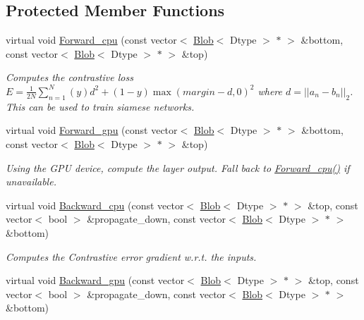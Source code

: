 \subsection*{Protected Member Functions}
\begin{DoxyCompactItemize}
\item 
virtual void \hyperlink{classcaffe_1_1ContrastiveLossLayer_a0719301088807da84f30ef2f028d0fde}{Forward\+\_\+cpu} (const vector$<$ \hyperlink{classcaffe_1_1Blob}{Blob}$<$ Dtype $>$ $\ast$ $>$ \&bottom, const vector$<$ \hyperlink{classcaffe_1_1Blob}{Blob}$<$ Dtype $>$ $\ast$ $>$ \&top)
\begin{DoxyCompactList}\small\item\em Computes the contrastive loss $ E = \frac{1}{2N} \sum\limits_{n=1}^N \left(y\right) d^2 + \left(1-y\right) \max \left(margin-d, 0\right)^2 $ where $ d = \left| \left| a_n - b_n \right| \right|_2 $. This can be used to train siamese networks. \end{DoxyCompactList}\item 
virtual void \hyperlink{classcaffe_1_1ContrastiveLossLayer_acc9c79ec2883380d41308c8212d0f845}{Forward\+\_\+gpu} (const vector$<$ \hyperlink{classcaffe_1_1Blob}{Blob}$<$ Dtype $>$ $\ast$ $>$ \&bottom, const vector$<$ \hyperlink{classcaffe_1_1Blob}{Blob}$<$ Dtype $>$ $\ast$ $>$ \&top)\hypertarget{classcaffe_1_1ContrastiveLossLayer_acc9c79ec2883380d41308c8212d0f845}{}\label{classcaffe_1_1ContrastiveLossLayer_acc9c79ec2883380d41308c8212d0f845}

\begin{DoxyCompactList}\small\item\em Using the G\+PU device, compute the layer output. Fall back to \hyperlink{classcaffe_1_1ContrastiveLossLayer_a0719301088807da84f30ef2f028d0fde}{Forward\+\_\+cpu()} if unavailable. \end{DoxyCompactList}\item 
virtual void \hyperlink{classcaffe_1_1ContrastiveLossLayer_ac29d021f30dbab75ca14cb79446926e5}{Backward\+\_\+cpu} (const vector$<$ \hyperlink{classcaffe_1_1Blob}{Blob}$<$ Dtype $>$ $\ast$ $>$ \&top, const vector$<$ bool $>$ \&propagate\+\_\+down, const vector$<$ \hyperlink{classcaffe_1_1Blob}{Blob}$<$ Dtype $>$ $\ast$ $>$ \&bottom)
\begin{DoxyCompactList}\small\item\em Computes the Contrastive error gradient w.\+r.\+t. the inputs. \end{DoxyCompactList}\item 
virtual void \hyperlink{classcaffe_1_1ContrastiveLossLayer_abdafac096cf9ba58eff8fe0621f0275a}{Backward\+\_\+gpu} (const vector$<$ \hyperlink{classcaffe_1_1Blob}{Blob}$<$ Dtype $>$ $\ast$ $>$ \&top, const vector$<$ bool $>$ \&propagate\+\_\+down, const vector$<$ \hyperlink{classcaffe_1_1Blob}{Blob}$<$ Dtype $>$ $\ast$ $>$ \&bottom)\hypertarget{classcaffe_1_1ContrastiveLossLayer_abdafac096cf9ba58eff8fe0621f0275a}{}\label{classcaffe_1_1ContrastiveLossLayer_abdafac096cf9ba58eff8fe0621f0275a}


\end{DoxyCompactItemize}
